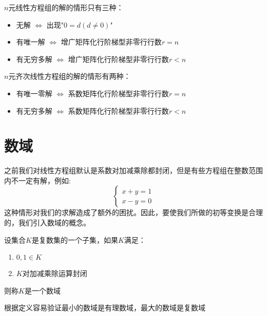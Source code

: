 \begin{theorem}[线性方程组解的情况及判定准则]
    $n$元线性方程组的解的情形只有三种：
    \begin{itemize}
        \item 无解 $\Longleftrightarrow$ 出现"$0=d(d\neq0)$"
        \item 有唯一解 $\Longleftrightarrow$ 增广矩阵化行阶梯型非零行行数$r=n$
        \item 有无穷多解 $\Longleftrightarrow$ 增广矩阵化行阶梯型非零行行数$r<n$
    \end{itemize}
\end{theorem}
\begin{corollary}
    $n$元齐次线性方程组的解的情形有两种：
    \begin{itemize}
        \item 有唯一零解  $\Longleftrightarrow$ 系数矩阵化行阶梯型非零行行数$r=n$
        \item 有无穷多解 $\Longleftrightarrow$ 系数矩阵化行阶梯型非零行行数$r<n$
    \end{itemize}
\end{corollary}

\section{数域}
之前我们对线性方程组默认是系数对加减乘除都封闭，但是有些方程组在整数范围内不一定有解，例如:
\begin{equation*}
    \begin{cases}
        x+y=1\\
        x-y=0
    \end{cases}
\end{equation*}
这种情形对我们的求解造成了额外的困扰。因此，要使我们所做的初等变换是合理的，我们引入数域的概念。
\begin{definition}[数域]
    设集合$K$是复数集的一个子集，如果$K$满足：
    \begin{enumerate}
        \item $0,1\in K$
        \item $K$对加减乘除运算封闭
    \end{enumerate}
    则称$K$是一个数域
\end{definition}
\begin{corollary}
    根据定义容易验证最小的数域是有理数域，最大的数域是复数域
\end{corollary}